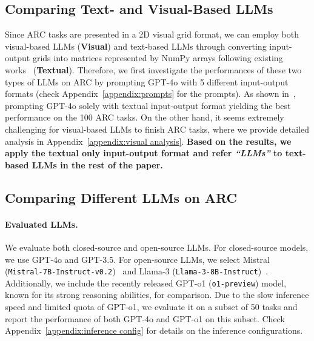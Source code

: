 \subsection{Comparing Text- and Visual-Based LLMs}
Since ARC tasks are presented in a 2D visual grid format, we can employ both visual-based LLMs (\textbf{Visual}) and text-based LLMs through
converting input-output grids into matrices represented by NumPy arrays following existing works~\cite{xullms,wang2023hypothesis} (\textbf{Textual}). Therefore, we first investigate the performances of these two types of LLMs on ARC by prompting GPT-4o with 5 different input-output formats (check Appendix~\ref{appendix:prompts} for the prompts). As shown in~, prompting GPT-4o solely with textual input-output format yielding the best performance on the 100 ARC tasks. On the other hand, it seems extremely challenging for visual-based LLMs to finish ARC tasks, where we provide detailed analysis in Appendix~\ref{appendix:visual analysis}. \textbf{Based on the results, we apply the textual only input-output format and refer \textit{``LLMs''} to text-based LLMs in the rest of the paper.}

\subsection{Comparing Different LLMs on ARC}
\label{sec:evaluate on original arc}
\paragraph{Evaluated LLMs.}
\label{evaluated llms}
We evaluate both closed-source and open-source LLMs. For closed-source models, we use GPT-4o and GPT-3.5. For open-source LLMs, we select Mistral (\texttt{Mistral-7B-Instruct-v0.2})~\cite{jiang2023mistral} and Llama-3 (\texttt{Llama-3-8B-Instruct})~\cite{llama3}. Additionally, we include the recently released GPT-o1 (\texttt{o1-preview}) model, known for its strong reasoning abilities, for comparison. Due to the slow inference speed and limited quota of GPT-o1, we evaluate it on a subset of 50 tasks and report the performance of both GPT-4o and GPT-o1 on this subset. Check Appendix~\ref{appendix:inference config} for details on the inference configurations.


